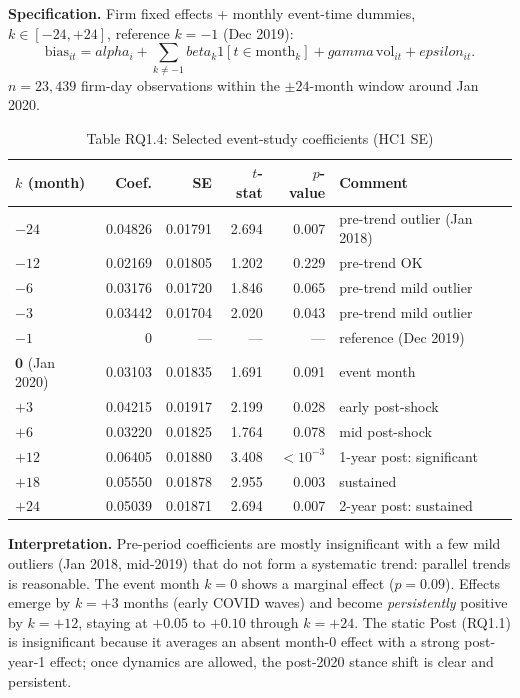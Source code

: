 \documentclass[11pt]{article}
\def\beta{beta}%
\def\alpha{alpha}%
\def\gamma{gamma}%
\def\varepsilon{epsilon}%
\def\mathbb#1{#1}%
\begin{document}
\textbf{Specification.} Firm fixed effects + monthly event-time dummies, $k \in [-24, +24]$, reference $k = -1$ (Dec 2019):
\[
\text{bias}_{it} = \alpha_i + \sum_{k \neq -1} \beta_k \mathbb{1}[t \in \text{month}_k] + \gamma\,\text{vol}_{it} + \varepsilon_{it}.
\]
$n = 23{,}439$ firm-day observations within the $\pm 24$-month window around Jan 2020.

\begin{table}[H]
\centering
\caption*{Table RQ1.4: Selected event-study coefficients (HC1 SE)}
\begin{tabular}{lrrrrl}
\toprule
$k$ (month) & Coef. & SE & $t$-stat & $p$-value & Comment \\
\midrule
$-24$ & 0.04826 & 0.01791 & 2.694 & 0.007 & pre-trend outlier (Jan 2018) \\
$-12$ & 0.02169 & 0.01805 & 1.202 & 0.229 & pre-trend OK \\
$-6$  & 0.03176 & 0.01720 & 1.846 & 0.065 & pre-trend mild outlier \\
$-3$  & 0.03442 & 0.01704 & 2.020 & 0.043 & pre-trend mild outlier \\
$-1$  & 0       & ---     & ---   & ---   & reference (Dec 2019) \\
$\mathbf{0}$ (Jan 2020) & 0.03103 & 0.01835 & 1.691 & 0.091 & event month \\
$+3$  & 0.04215 & 0.01917 & 2.199 & 0.028 & early post-shock \\
$+6$  & 0.03220 & 0.01825 & 1.764 & 0.078 & mid post-shock \\
$+12$ & 0.06405 & 0.01880 & 3.408 & $<10^{-3}$ & 1-year post: significant \\
$+18$ & 0.05550 & 0.01878 & 2.955 & 0.003 & sustained \\
$+24$ & 0.05039 & 0.01871 & 2.694 & 0.007 & 2-year post: sustained \\
\bottomrule
\end{tabular}
\end{table}

\textbf{Interpretation.} Pre-period coefficients are mostly insignificant with a few mild outliers (Jan 2018, mid-2019) that do not form a systematic trend: parallel trends is reasonable. The event month $k = 0$ shows a marginal effect ($p = 0.09$). Effects emerge by $k = +3$ months (early COVID waves) and become \emph{persistently} positive by $k = +12$, staying at $+0.05$ to $+0.10$ through $k = +24$. The static Post (RQ1.1) is insignificant because it averages an absent month-0 effect with a strong post-year-1 effect; once dynamics are allowed, the post-2020 stance shift is clear and persistent.
\end{document}
